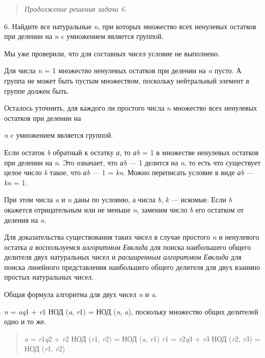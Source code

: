 \documentclass[12pt]{article}
\begin{document}
    \begin{quote}
        \emph{Продолжение решения задачи 6.}
    \end{quote}

    6. Найдите все натуральные \emph{n}, при которых множество всех
    ненулевых остатков при делении на \emph{n} c умножением является
    группой.

    Мы уже проверили, что для составных чисел условие не выполнено.

    Для числа \emph{n} = 1 множество ненулевых остатков при делении на
    \emph{n} пусто. А группа не может быть пустым множеством, поскольку
    нейтральный элемент в группе должен быть.

    Осталось уточнить, для каждого ли простого числа \emph{n} множество всех
    ненулевых остатков при делении на

    \emph{n} c умножением является группой.

    Если остаток \emph{b} обратный к остатку \emph{а}, то \emph{аb} = 1 в
    множестве ненулевых остатков при делении на \emph{n}. Это означает, что
    \emph{аb} --- 1 делится на \emph{n}, то есть что существует целое число
    \emph{k} такое, что \emph{аb} --- 1 = \emph{kn}. Можно переписать условие
    в виде \emph{аb} --- \emph{kn} = 1.

    При этом числа \emph{a} и \emph{n} даны по условию, а числа \emph{b},
    \emph{k} --- искомые. Если \emph{b} окажется отрицательным или не меньше
    \emph{n}, заменим число \emph{b} его остатком от деления на \emph{n}.

    Для доказательства существования таких чисел в случае простого \emph{n}
    и ненулевого остатка \emph{а} воспользуемся \emph{алгоритмом Евклида}
    для поиска наибольшего общего делителя двух натуральных чисел и
    \emph{расширенным алгоритмом Евклида} для поиска линейного представления
    наибольшего общего делителя для двух взаимно простых натуральных чисел.

    Общая формула алгоритма для двух чисел \emph{n} и \emph{a}.

    \emph{n} = \emph{aq}1 + \emph{r}1 НОД (\emph{a}, \emph{r}1) = НОД
    (\emph{n}, \emph{a}), поскольку множество общих делителей одно и то же.

    \begin{quote}
        \emph{a} = \emph{r}1\emph{q}2 + \emph{r}2 НОД (\emph{r}1, \emph{r}2) =
        НОД (\emph{a}, \emph{r}1) \emph{r}1 = \emph{r}2\emph{q}3 + \emph{r}3 НОД
        (\emph{r}2, \emph{r}3) = НОД (\emph{r}1, \emph{r}2)
    \end{quote}
\end{document}
